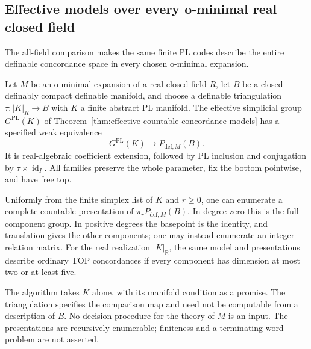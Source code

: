 \subsection{Effective models over every o-minimal real closed field}

The all-field comparison makes the same finite PL codes describe
the entire definable concordance space in every chosen o-minimal
expansion.

\begin{corollary}\label{cor:effective-whole-definable-concordances}
Let $M$ be an o-minimal expansion of a real closed field $R$,
let $B$ be a closed definably compact definable manifold, and
choose a definable triangulation
$\tau:|K|_R\longrightarrow B$ with $K$ a finite abstract PL
manifold. The effective simplicial group
$G^{\mathrm{PL}}(K)$ of
Theorem~\ref{thm:effective-countable-concordance-models}
has a specified weak equivalence
\begin{equation}\label{eq:effective-whole-definable-model}
 G^{\mathrm{PL}}(K)\longrightarrow P_{\mathrm{def},M}(B).
\end{equation}
It is real-algebraic coefficient extension, followed by PL
inclusion and conjugation by $\tau\times\operatorname{id}_I$.
All families preserve the whole parameter, fix the bottom
pointwise, and have free top.

Uniformly from the finite simplex list of $K$ and $r\geq0$,
one can enumerate a complete countable presentation of
$\pi_rP_{\mathrm{def},M}(B)$. In degree zero this is the
full component group. In positive degrees the basepoint
is the identity, and translation gives the other components;
one may instead enumerate an integer relation matrix.
For the real realization $|K|_{\mathbb R}$, the same model
and presentations describe ordinary TOP concordances if
every component has dimension at most two or at least five.

The algorithm takes $K$ alone, with its manifold condition
as a promise. The triangulation specifies the comparison
map and need not be computable from a description of $B$.
No decision procedure for the theory of $M$ is an input.
The presentations are recursively enumerable; finiteness
and a terminating word problem are not asserted.
\end{corollary}


